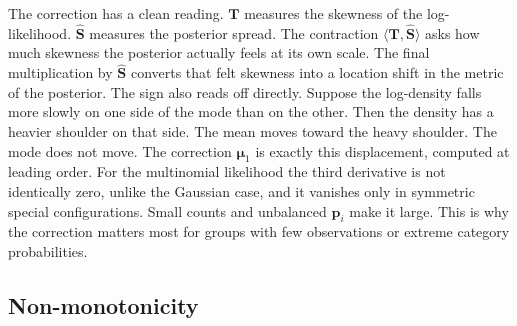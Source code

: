 The correction has a clean reading. $\mathbf{T}$ measures the skewness of the log-likelihood. $\hat{\mathbf{S}}$ measures the posterior spread. The contraction $\langle\mathbf{T},\hat{\mathbf{S}}\rangle$ asks how much skewness the posterior actually feels at its own scale. The final multiplication by $\hat{\mathbf{S}}$ converts that felt skewness into a location shift in the metric of the posterior. The sign also reads off directly. Suppose the log-density falls more slowly on one side of the mode than on the other. Then the density has a heavier shoulder on that side. The mean moves toward the heavy shoulder. The mode does not move. The correction $\bm{\mu}_{1}$ is exactly this displacement, computed at leading order. For the multinomial likelihood the third derivative is not identically zero, unlike the Gaussian case, and it vanishes only in symmetric special configurations. Small counts and unbalanced $\bm{p}_{i}$ make it large. This is why the correction matters most for groups with few observations or extreme category probabilities.
 
\subsection{Non-monotonicity}
\label{subsec:non-monotonicity}


